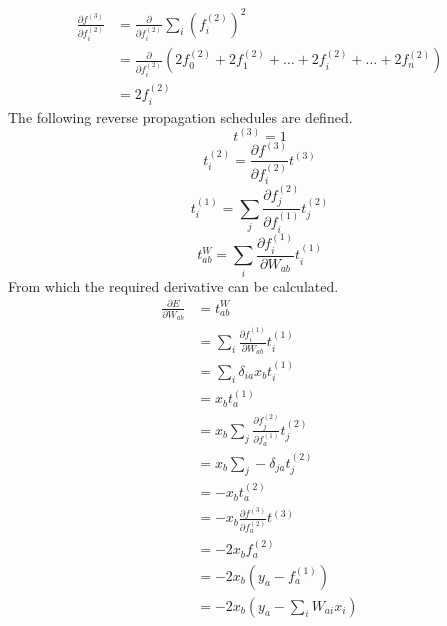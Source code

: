 \documentclass[fleqn]{article}
\begin{document}
\begin{equation}
    \begin{split}
        \frac{\partial f^{(3)}}{\partial f^{(2)}_i} & =
        \frac{\partial}{\partial f^{(2)}_i} \sum_i \left( f^{(2)}_i \right )^2\\
        & = \frac{\partial}{\partial f^{(2)}_i}
        \left ( 2 f^{(2)}_0 + 2 f^{(2)}_1 + \dots + 2 f^{(2)}_i + \dots + 2 f^{(2)}_n  \right ) \\
        & = 2 f^{(2)}_i
    \end{split}
\end{equation}
The following reverse propagation schedules are defined.
\begin{equation}
    t^{(3)} = 1
\end{equation}
\begin{equation}
    t^{(2)}_i = \frac{\partial f^{(3)}}{\partial f^{(2)}_i} t^{(3)}
\end{equation}
\begin{equation}
    t^{(1)}_i = \sum_j \frac{\partial f^{(2)}_j}{\partial f^{(1)}_i} t^{(2)}_j
\end{equation}
\begin{equation}
    t^{W}_{ab} = \sum_i \frac{\partial f^{(1)}_i}{\partial W_{ab}} t^{(1)}_i
\end{equation}
From which the required derivative can be calculated.
\begin{equation}
    \begin{split}
        \frac{\partial E}{\partial W_{ab}} & = t^{W}_{ab} \\
        & = \sum_i \frac{\partial f^{(1)}_i}{\partial W_{ab}} t^{(1)}_i \\
        & = \sum_i \delta_{ia} x_b t^{(1)}_i \\
        & = x_b t^{(1)}_a \\
        & = x_b \sum_j \frac{\partial f^{(2)}_j}{\partial f^{(1)}_a} t^{(2)}_j \\
        & = x_b \sum_j - \delta_{ja} t^{(2)}_j \\
        & = - x_b t^{(2)}_a \\
        & = - x_b \frac{\partial f^{(3)}}{\partial f^{(2)}_a} t^{(3)} \\
        & = - 2 x_b f^{(2)}_a \\
        & = - 2 x_b \left ( y_a - f^{(1)}_a \right ) \\
        & = - 2 x_b \left ( y_a - \sum_i W_{ai} x_i \right )
    \end{split}
\end{equation}
\end{document}
